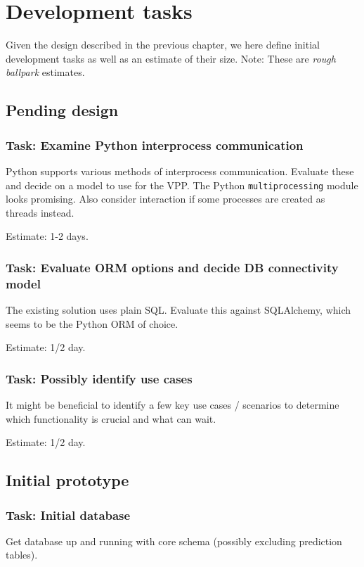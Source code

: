 \chapter{Development tasks}
Given the design described in the previous chapter, we here define initial development tasks as well as an estimate of their size. 
Note: These are \emph{rough ballpark} estimates.


\section{Pending design}

\subsection{Task: Examine Python interprocess communication}
Python supports various methods of interprocess communication. Evaluate these and decide on a model to use for the VPP. The Python \texttt{multiprocessing} module looks promising. Also consider interaction if some processes are created as threads instead.

Estimate: 1-2 days.

\subsection{Task: Evaluate ORM options and decide DB connectivity model} \label{task:orm}
The existing solution uses plain SQL. Evaluate this against SQLAlchemy, which seems to be the Python ORM of choice.

Estimate: 1/2 day.

\subsection{Task: Possibly identify use cases}
It might be beneficial to identify a few key use cases / scenarios to determine which functionality is crucial and what can wait.

Estimate: 1/2 day.

\section{Initial prototype}

\subsection{Task: Initial database}
Get database up and running with core schema (possibly excluding prediction tables). 

